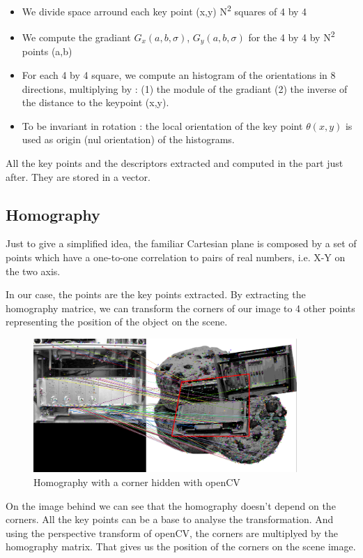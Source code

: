 \documentclass[english,a4paper,11pt]{report}
\newcommand{\ts}{\textsuperscript}
\begin{document}
	\begin{itemize}
			\item We divide space arround each key point (x,y) N\ts{2} squares of 4 by 4
		\item We compute the gradiant \begin{math}G_{x}(a,b,\sigma)\end{math}, \begin{math}G_{y}(a,b,\sigma)\end{math} for the 4 by 4 by N\ts{2} points (a,b)

		\item For each 4 by 4 square, we compute an histogram of the orientations in 8 directions, multiplying by : (1) the module of the gradiant (2) the inverse of the distance to the keypoint (x,y).
		\item  To be invariant in rotation : the local orientation of the key point \begin{math} \theta(x,y) \end{math} is used as origin (nul orientation) of the histograms.		
	\end{itemize}

	\par All the key points and the descriptors extracted and computed in the  part just after. They are stored in a vector.
	
	
	\subsection{Homography}
	\par  Just to give a simplified idea, the familiar Cartesian plane is composed by a set of points which have a one-to-one correlation to pairs of real numbers, i.e. X-Y on the two axis.\cite{Homography}
	\par In our case, the points are the key points extracted. By extracting the homography matrice, we can transform the corners of our image to 4 other points representing the position of the object on the scene.
	
	\begin{figure}
			\includegraphics[width=10cm]{images_not_compressed/showHomography.png}
			\caption{Homography with a corner hidden with openCV}
	\end{figure}
	\par On the image behind we can see that the homography doesn't depend on the corners. All the key points can be a base to analyse the transformation. And using the perspective transform of openCV, the corners are multiplyed by the homography matrix. That gives us the position of the corners on the scene image.
	
\end{document}
